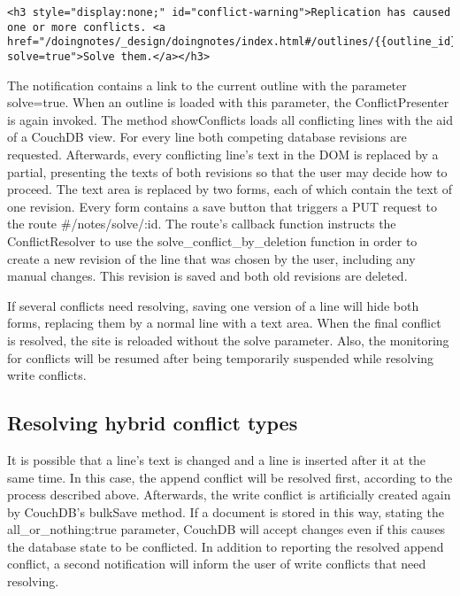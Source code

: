 \lstset{language=html}
\medskip 
\begin{lstlisting}[caption=Notification of conflicting database state]
<h3 style="display:none;" id="conflict-warning">Replication has caused one or more conflicts. <a href="/doingnotes/_design/doingnotes/index.html#/outlines/{{outline_id}}?solve=true">Solve them.</a></h3>
\end{lstlisting}

The notification contains a link to the current outline with the parameter {\selectfont solve=true}. When an outline is loaded with this parameter, the {\selectfont ConflictPresenter} is again invoked. The method {\selectfont showConflicts} loads all conflicting lines with the aid of a CouchDB view. For every line both competing database revisions are requested. Afterwards, every conflicting line's text in the DOM is replaced by a partial, presenting the texts of both revisions so that the user may decide how to proceed. The text area is replaced by two forms, each of which contain the text of one revision. Every form contains a save button that triggers a PUT request to the route {\selectfont\#/notes/solve/:id}. The route's callback function instructs the {\selectfont ConflictResolver} to use the {\selectfont solve\_conflict\_by\_deletion} function in order to create a new revision of the line that was chosen by the user, including any manual changes. This revision is saved and both old revisions are deleted.

If several conflicts need resolving, saving one version of a line will hide both forms, replacing them by a normal line with a text area. When the final conflict is resolved, the site is reloaded without the {\selectfont solve} parameter. Also, the monitoring for conflicts will be resumed after being temporarily suspended while resolving write conflicts.

\subsection{Resolving hybrid conflict types}

It is possible that a line's text is changed and a line is inserted after it at the same time. In this case, the append conflict will be resolved first, according to the process described above. Afterwards, the write conflict is artificially created again by CouchDB's {\selectfont bulkSave} method. If a document is stored in this way, stating the {\selectfont all\_or\_nothing:true} parameter, CouchDB will accept changes even if this causes the database state to be conflicted. In addition to reporting the resolved append conflict, a second notification will inform the user of write conflicts that need resolving.